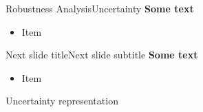 \begin{frame}{Robustness Analysis}{Uncertainty}
	 \textbf{Some text}
	 \begin{itemize}
	 	\item Item
	 \end{itemize}
\end{frame}


\begin{frame}{Next slide title}{Next slide subtitle}
	 \textbf{Some text}
	\begin{itemize}
		\item Item
	\end{itemize}
\end{frame}


\begin{frame}{Uncertainty representation}
	\begin{figure}[h!]
		\centering
		\resizebox{\columnwidth}{!}{
			}
		\label{fig:tikzControlStrat}
	\end{figure}
\end{frame}

